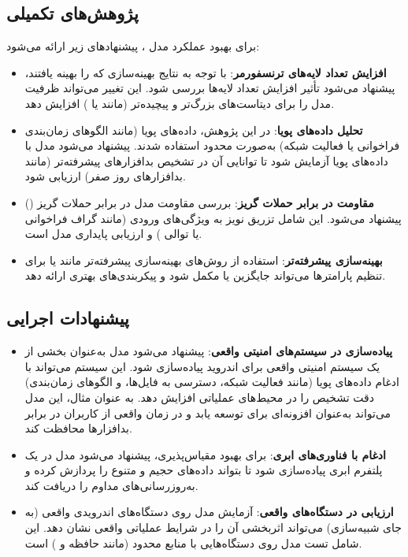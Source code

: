 \subsection{پژوهش‌های تکمیلی}
برای بهبود عملکرد مدل ، پیشنهادهای زیر ارائه می‌شود:
\begin{itemize}
    \renewcommand{\labelitemi}{\lr{$\bullet$}}
    \item \textbf{افزایش تعداد لایه‌های ترنسفورمر}: با توجه به نتایج بهینه‌سازی که  را بهینه یافتند، پیشنهاد می‌شود تأثیر افزایش تعداد لایه‌ها بررسی شود. این تغییر می‌تواند ظرفیت مدل را برای دیتاست‌های بزرگ‌تر و پیچیده‌تر (مانند  یا  \cite{AndroZoo}) افزایش دهد.
    \item \textbf{تحلیل داده‌های پویا}: در این پژوهش، داده‌های پویا (مانند الگوهای زمان‌بندی فراخوانی  یا فعالیت شبکه) به‌صورت محدود استفاده شدند. پیشنهاد می‌شود مدل  با داده‌های پویا آزمایش شود تا توانایی آن در تشخیص بدافزارهای پیشرفته‌تر (مانند بدافزارهای روز صفر) ارزیابی شود.
    \item \textbf{مقاومت در برابر حملات گریز}: بررسی مقاومت مدل در برابر حملات گریز () پیشنهاد می‌شود. این شامل تزریق نویز به ویژگی‌های ورودی (مانند گراف فراخوانی یا توالی ) و ارزیابی پایداری مدل است.
    \item \textbf{بهینه‌سازی پیشرفته‌تر}: استفاده از روش‌های بهینه‌سازی پیشرفته‌تر مانند  یا  برای تنظیم پارامترها می‌تواند جایگزین یا مکمل  \cite{Optuna2019} شود و پیکربندی‌های بهتری ارائه دهد.
\end{itemize}

\subsection{پیشنهادات اجرایی}
\begin{itemize}
    \renewcommand{\labelitemi}{\lr{$\bullet$}}
    \item \textbf{پیاده‌سازی در سیستم‌های امنیتی واقعی}: پیشنهاد می‌شود مدل  به‌عنوان بخشی از یک سیستم امنیتی واقعی برای اندروید پیاده‌سازی شود. این سیستم می‌تواند با ادغام داده‌های پویا (مانند فعالیت شبکه، دسترسی به فایل‌ها، و الگوهای زمان‌بندی) دقت تشخیص را در محیط‌های عملیاتی افزایش دهد. به عنوان مثال، این مدل می‌تواند به‌عنوان افزونه‌ای برای  توسعه یابد و در زمان واقعی از کاربران در برابر بدافزارها محافظت کند.
    \item \textbf{ادغام با فناوری‌های ابری}: برای بهبود مقیاس‌پذیری، پیشنهاد می‌شود مدل  در یک پلتفرم ابری پیاده‌سازی شود تا بتواند داده‌های حجیم و متنوع را پردازش کرده و به‌روزرسانی‌های مداوم را دریافت کند.
    \item \textbf{ارزیابی در دستگاه‌های واقعی}: آزمایش مدل روی دستگاه‌های اندرویدی واقعی (به جای شبیه‌سازی) می‌تواند اثربخشی آن را در شرایط عملیاتی واقعی نشان دهد. این شامل تست مدل روی دستگاه‌هایی با منابع محدود (مانند حافظه و ) است.
\end{itemize}

